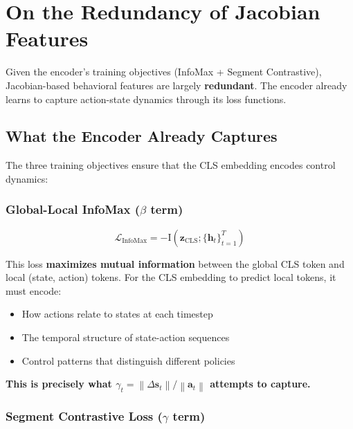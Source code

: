 \documentclass[11pt,a4paper]{article}
\newcommand{\vect}[1]{\mathbf{#1}}
\newcommand{\norm}[1]{\left\|#1\right\|}
\newcommand{\MI}{\mathrm{I}}
\begin{document}
\section{On the Redundancy of Jacobian Features}
\label{sec:redundancy}

\begin{tcolorbox}[colback=red!5,colframe=red!40!black,title=Key Finding]
Given the encoder's training objectives (InfoMax + Segment Contrastive), Jacobian-based behavioral features are largely \textbf{redundant}. The encoder already learns to capture action-state dynamics through its loss functions.
\end{tcolorbox}

\subsection{What the Encoder Already Captures}

The three training objectives ensure that the CLS embedding encodes control dynamics:

\subsubsection{Global-Local InfoMax ($\beta$ term)}

\begin{equation}
    \mathcal{L}_{\text{InfoMax}} = -\MI(\vect{z}_{\text{CLS}}; \{\vect{h}_t\}_{t=1}^T)
\end{equation}

This loss \textbf{maximizes mutual information} between the global CLS token and local (state, action) tokens. For the CLS embedding to predict local tokens, it must encode:
\begin{itemize}
    \item How actions relate to states at each timestep
    \item The temporal structure of state-action sequences
    \item Control patterns that distinguish different policies
\end{itemize}

\textbf{This is precisely what $\gamma_t = \norm{\Delta \vect{s}_t} / \norm{\vect{a}_t}$ attempts to capture.}

\subsubsection{Segment Contrastive Loss ($\gamma$ term)}
\end{document}
